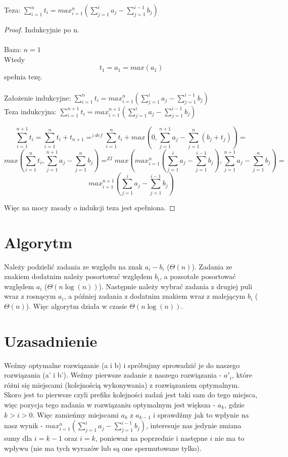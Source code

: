 \documentclass{article}
\begin{document}
Teza: $\sum_{i=1}^{n} t_{i} = max_{i=1}^{n}(\sum_{j=1}^{i} a_{j} - \sum_{j=1}^{i-1} b_{j})$
\begin{proof}
Indukcyjnie po n.\\ \\
Baza: $n = 1$\\
Wtedy $$t_{1} = a_{1} = max(a_{1})$$spełnia tezę. \\ \\
Założenie indukcyjne: $\sum_{i=1}^{n} t_{i} = max_{i=1}^{n}(\sum_{j=1}^{i} a_{j} - \sum_{j=1}^{i-1} b_{j})$\\
Teza indukcyjna: $\sum_{i=1}^{n+1} t_{i} = max_{i=1}^{n+1}(\sum_{j=1}^{i} a_{j} - \sum_{j=1}^{i-1} b_{j})$

$$\sum_{i=1}^{n+1} t_{i} = \sum_{i=1}^{n} t_{i} + t_{n+1} =^{z \ def} \sum_{i=1}^{n} t_{i} + max(0, \sum_{j=1}^{n+1} a_{j} - \sum_{j=1}^{n} (b_{j} + t_{j})) =$$ 
$$max(\sum_{i=1}^{n} t_{i}, \sum_{j=1}^{n+1} a_{j} - \sum_{j=1}^{n} b_{j}) =^{ZI} max(max_{i=1}^{n}(\sum_{j=1}^{i} a_{j} - \sum_{j=1}^{i-1} b_{j}), \sum_{j=1}^{n+1} a_{j} - \sum_{j=1}^{n} b_{j}) =$$
$$max_{i=1}^{n+1}(\sum_{j=1}^{i} a_{j} - \sum_{j=1}^{i-1} b_{j})$$

Więc na mocy zasady o indukcji teza jest spełniona.
\end{proof}
\section{Algorytm}
Należy podzielić zadania ze względu na znak $a_{i}-b_{i}$ ($\Theta(n)$). Zadania ze znakiem dodatnim należy posortować względem $b_{i}$, a pozsotałe posortować względem $a_{i}$ ($\Theta(n\log(n))$). Następnie należy wybrać zadania z drugiej puli wraz z rosnącym $a_{i}$, a później zadania z dodatnim znakiem wraz z malejącym $b_{i}$ ($\Theta(n)$). Więc algorytm działa w czasie $\Theta(n\log(n))$.

\section{Uzasadnienie}
Weźmy optymalne rozwiązanie (a i b) i spróbujmy sprowadzić je do naszego rozwiązania (a' i b'). Weźmy pierwsze zadanie z naszego rozwiązania - $a'_{i}$, które różni się miejscami (kolejnością wykonywania) z rozwiązaniem optymalnym. Skoro jest to pierwsze czyli prefiks kolejności zadań jest taki sam do tego miejsca, więc pozycja tego zadania w rozwiązaniu optymalnym jest większa - $a_{k}$, gdzie $k > i > 0$. Więc zamieńmy miejscami $a_{k}$ z $a_{k-1}$ i sprawdźmy jak to wpłynie na nasz wynik - $max_{i=1}^{n}(\sum_{j=1}^{i} a_{j} - \sum_{j=1}^{i-1} b_{j})$, interesuje nas jedynie zmiana sumy dla $i = k-1$ oraz $i = k$, ponieważ na poprzednie i następne $i$ nie ma to wpływu (nie ma tych wyrazów lub są one spermutowane tylko). 
\end{document}

